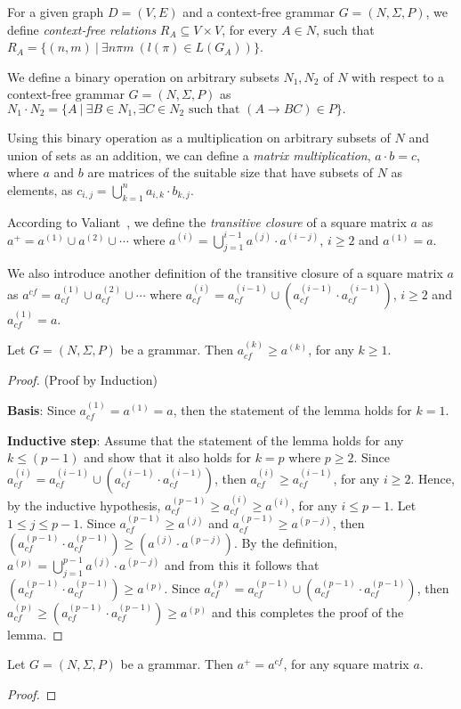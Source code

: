 For a given graph $D = (V, E)$ and a context-free grammar $G = (N, \Sigma, P)$, we define \textit{context-free relations} $R_A \subseteq V \times V$, for every $A \in N$, such that $R_A = \{(n,m)~|~\exists n \pi m~(l(\pi) \in L(G_A))\}$.

We define a binary operation on arbitrary subsets $N_1 , N_2$ of $N$ with respect to a context-free grammar $G = (N, \Sigma, P)$ as $N_1 \cdot N_2 = \{A~|~\exists B \in N_1, \exists C \in N_2 \text{ such that }(A \rightarrow B C) \in P\}.$

Using this binary operation as a multiplication on arbitrary subsets of $N$ and union of sets as an addition, we can define a \textit{matrix multiplication}, $a \cdot b = c$, where $a$ and $b$ are matrices of the suitable size that have subsets of $N$ as elements, as $c_{i,j} = \bigcup^{n}_{k=1}{a_{i,k} \cdot b_{k,j}}$.

According to Valiant~\cite{valiant}, we define the \textit{transitive closure} of a square matrix $a$ as $a^+ = a^{(1)} \cup a^{(2)} \cup \cdots$ where $a^{(i)} = \bigcup^{i-1}_{j=1}{a^{(j)} \cdot a^{(i-j)}}$, $i \ge 2$ and $a^{(1)} = a$.

We also introduce another definition of the transitive closure of a square matrix $a$ as $a^{cf} = a^{(1)}_{cf} \cup a^{(2)}_{cf} \cup \cdots$ where $a^{(i)}_{cf} = a^{(i-1)}_{cf} \cup (a^{(i-1)}_{cf} \cdot a^{(i-1)}_{cf})$, $i \ge 2$ and $a^{(1)}_{cf} = a$.

\begin{lemma}\label{lemma:cf_geq_valiant}
	Let $G =(N,\Sigma,P)$ be a grammar. Then $a^{(k)}_{cf} \geq a^{(k)}$, for any $k \geq 1$.
\end{lemma}
\begin{proof}(Proof by Induction)
	
	\textbf{Basis}: Since  $a^{(1)}_{cf} = a^{(1)} = a$, then the statement of the lemma holds for $k = 1$.
	
	\textbf{Inductive step}: Assume that the statement of the lemma holds for any $k \leq (p - 1)$ and show that it also holds for $k = p$ where $p \geq 2$. Since $a^{(i)}_{cf} = a^{(i-1)}_{cf} \cup (a^{(i-1)}_{cf} \cdot a^{(i-1)}_{cf})$, then $a^{(i)}_{cf} \geq a^{(i-1)}_{cf}$, for any $i \geq 2$. Hence, by the inductive hypothesis, $a^{(p-1)}_{cf} \geq a^{(i)}_{cf} \geq a^{(i)}$, for any $i \leq p-1$. Let $1 \leq j \leq p - 1$. Since $a^{(p-1)}_{cf} \geq a^{(j)}$ and $a^{(p-1)}_{cf} \geq a^{(p-j)}$, then $(a^{(p-1)}_{cf} \cdot a^{(p-1)}_{cf}) \geq (a^{(j)} \cdot a^{(p-j)})$. By the definition, $a^{(p)} = \bigcup^{p-1}_{j=1}{a^{(j)} \cdot a^{(p-j)}}$ and from this it follows that $(a^{(p-1)}_{cf} \cdot a^{(p-1)}_{cf}) \geq a^{(p)}$. Since $a^{(p)}_{cf} = a^{(p-1)}_{cf} \cup (a^{(p-1)}_{cf} \cdot a^{(p-1)}_{cf})$, then $a^{(p)}_{cf} \geq (a^{(p-1)}_{cf} \cdot a^{(p-1)}_{cf}) \geq a^{(p)}$ and this completes the proof of the lemma.
\end{proof}

\begin{mytheorem}\label{thm:closures}
	Let $G =(N,\Sigma,P)$ be a grammar. Then $a^+ = a^{cf}$, for any square matrix $a$.
\end{mytheorem}
\begin{proof}
	

\end{proof}